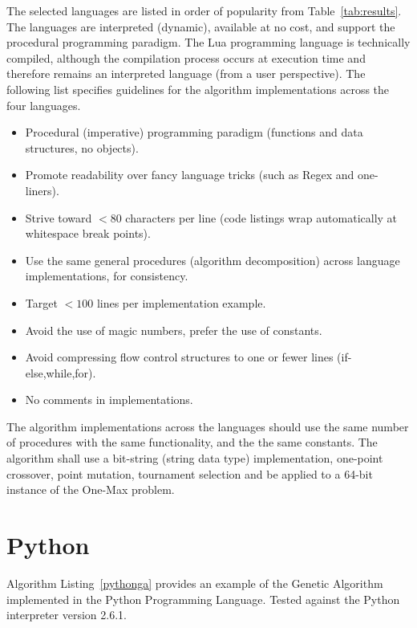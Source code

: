 \documentclass[a4paper, 11pt]{article}
\begin{document}
The selected languages are listed in order of popularity from Table~\ref{tab:results}. The languages are interpreted (dynamic),  available at no cost, and support the procedural programming paradigm. The Lua programming language is technically compiled, although the compilation process occurs at execution time and therefore remains an interpreted language (from a user perspective).
The following list specifies guidelines for the algorithm implementations across the four languages. 
\begin{itemize}
	\item Procedural (imperative) programming paradigm (functions and data structures, no objects).
	\item Promote readability over fancy language tricks (such as Regex and one-liners).
	\item Strive toward $<80$ characters per line (code listings wrap automatically at whitespace break points).
	\item Use the same general procedures (algorithm decomposition) across language implementations, for consistency.
	\item Target $<100$ lines per implementation example.
	\item Avoid the use of magic numbers, prefer the use of constants.
	\item Avoid compressing flow control structures to one or fewer lines (if-else,while,for).
	\item No comments in implementations.
\end{itemize}

The algorithm implementations across the languages should use the same number of procedures with the same functionality, and the the same constants. The algorithm shall use a bit-string (string data type) implementation, one-point crossover, point mutation, tournament selection and be applied to a 64-bit instance of the One-Max problem. 

% 
% 
\section{Python}
\label{sec:python}
Algorithm Listing~\ref{pythonga} provides an example of the Genetic Algorithm implemented in the Python Programming Language. Tested against the Python interpreter version 2.6.1.

\end{document}
